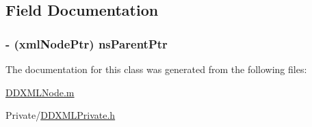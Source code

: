 \subsection{Field Documentation}
\hypertarget{class_d_d_x_m_l_namespace_node_aa06097214d369b66af226112ca1248a2}{
\subsubsection[{nsParentPtr}]{\setlength{\rightskip}{0pt plus 5cm}-\/ (xmlNodePtr) {\bf nsParentPtr}}}
\label{class_d_d_x_m_l_namespace_node_aa06097214d369b66af226112ca1248a2}


The documentation for this class was generated from the following files:\begin{DoxyCompactItemize}
\item 
\hyperlink{_d_d_x_m_l_node_8m}{DDXMLNode.m}\item 
Private/\hyperlink{_d_d_x_m_l_private_8h}{DDXMLPrivate.h}\end{DoxyCompactItemize}
